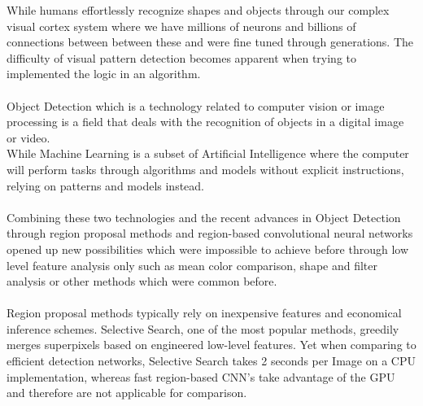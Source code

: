 
While humans effortlessly recognize shapes and objects through our complex visual cortex system where we have millions of neurons and
billions of connections between between these and were fine tuned through generations. The difficulty of visual pattern detection becomes
apparent when trying to implemented the logic in an algorithm.\cite{neuralnetworksanddeeplearning} \\ \\
Object Detection which is a technology related to computer vision or image processing is a field that deals with the recognition of objects
in a digital image or video.\\
While Machine Learning is a subset of Artificial Intelligence where the computer will perform tasks through algorithms and models without
explicit instructions, relying on patterns  and models instead.\\ \\
Combining these two technologies and the recent advances in Object Detection through region proposal methods and region-based convolutional
neural networks opened up new possibilities which were impossible to achieve before through low level feature analysis only such as mean
color comparison, shape and filter analysis or other methods which were common before. \\ \\
Region proposal methods typically rely on inexpensive features and economical inference schemes. Selective Search, one of the most popular
methods, greedily merges superpixels based on engineered low-level features. Yet when comparing to efficient detection networks, Selective
Search takes 2 seconds per Image on a CPU implementation, whereas fast region-based CNN's take advantage of the GPU and therefore are not
applicable for comparison.\cite{fasterrcnn}


